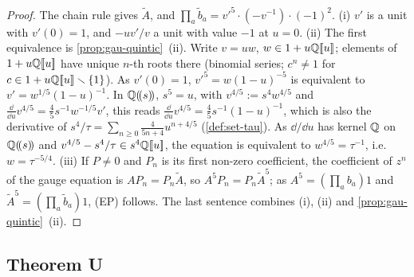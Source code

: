 \begin{proof}
The chain rule gives $\tilde A$, and $\prod_a\tilde b_a=v'^5\cdot(-v^{-1})\cdot(-1)^2$. (i) $v'$ is a unit with $v'(0)=1$, and $-uv'/v$ a unit with value $-1$ at $u=0$. (ii) The first equivalence is \cref{prop:gau-quintic}~(ii). Write $v=uw$, $w\in1+u\mathbb{Q}[\![ u ]\!]$; elements of $1+u\mathbb{Q}[\![ u ]\!]$ have unique $n$-th roots there (binomial series; $c^n\neq1$ for $c\in1+u\mathbb{Q}[\![ u ]\!]\smallsetminus\{1\}$). As $v'(0)=1$, $v'^5=w(1-u)^{-5}$ is equivalent to $v'=w^{1/5}(1-u)^{-1}$. In $\mathbb{Q}(\!(s)\!)$, $s^5=u$, with $v^{4/5}:=s^4w^{4/5}$ and $\frac{\dd}{\dd u}v^{4/5}=\frac45s^{-1}w^{-1/5}v'$, this reads $\frac{\dd}{\dd u}v^{4/5}=\frac45s^{-1}(1-u)^{-1}$, which is also the derivative of $s^4/\tau=\sum_{n\geq0}\frac4{5n+4}u^{n+4/5}$ (\cref{def:set-tau}). As $\dd/\dd u$ has kernel $\mathbb{Q}$ on $\mathbb{Q}(\!(s)\!)$ and $v^{4/5}-s^4/\tau\in s^4\mathbb{Q}[\![ u ]\!]$, the equation is equivalent to $w^{4/5}=\tau^{-1}$, i.e.\ $w=\tau^{-5/4}$. (iii) If $P\neq0$ and $P_n$ is its first non-zero coefficient, the coefficient of $z^n$ of the gauge equation is $AP_n=P_n\tilde A$, so $A^5P_n=P_n\tilde A^5$; as $A^5=(\prod_ab_a)1$ and $\tilde A^5=(\prod_a\tilde b_a)1$, (EP) follows. The last sentence combines (i), (ii) and \cref{prop:gau-quintic}~(ii).
\end{proof}

\subsection{Theorem U}
\label{sec:gau-U}

